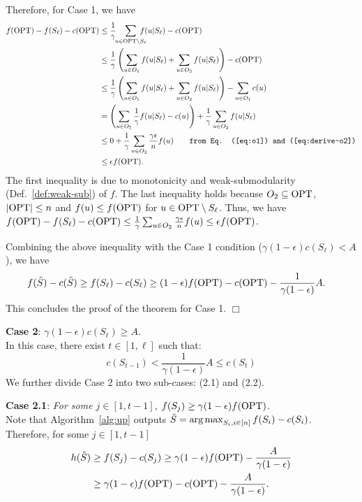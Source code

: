 \documentclass[10pt]{article} %
\DeclareMathOperator*{\argmax}{arg\,max}
\theoremstyle{remark}
\newcommand{\OPT}{{\rm OPT}}
\begin{document}
    Therefore, for Case 1, we have
    \begin{align*}
        f(\OPT)-f(S_\ell)-c(\OPT) &\leq \frac{1}{\gamma}\!\!\sum_{u \in \OPT \setminus S_{\ell}}\!\!\!\!\!\! f(u|S_\ell)-c(\OPT)\\
        &\leq \frac{1}{\gamma}\left(\sum_{u \in O_1} f(u|S_\ell)+\sum_{u \in O_2} f(u|S_\ell)\right)-c(\OPT)\\
        &\leq \frac{1}{\gamma}\left(\sum_{u \in O_1} f(u|S_\ell)+\sum_{u \in O_2} f(u|S_\ell)\right)-\sum_{u \in O_1} c(u) \\
        &=\left(\sum_{u \in O_1} \frac{1}{\gamma} f(u|S_\ell) - c(u)\right)+\frac{1}{\gamma}\sum_{u \in O_2} f(u|S_\ell)\\
        &\leq 0 + \frac{1}{\gamma} \sum_{u \in O_2} \frac{\gamma \epsilon}{n} f(u) \quad \quad \mbox{\tt from  Eq. (\ref{eq:o1}) and (\ref{eq:derive-o2})}\\
        &\leq \epsilon f(\OPT) .
    \end{align*}
    The first inequality is due to monotonicity and weak-submodularity (Def.~\ref{def:weak-sub}) of $f$.  The last inequality holds because $O_2 \subseteq \OPT$, $|\OPT| \leq n$ and $f(u) \leq f(\OPT)$ for $u \in \OPT \setminus S_\ell$. Thus, we have  $f(\OPT)-f(S_\ell)-c(\OPT) \leq \frac{1}{\gamma} \sum_{u \in O_2} \frac{\gamma \epsilon}{n} f(u) \leq \epsilon f(\OPT)$. 
     
     Combining the above inequality with the Case 1 condition ($\gamma (1-\epsilon)c(S_\ell) < A$), we have 
     \begin{align*}
         f(\Tilde{S})-c(\Tilde{S})& \geq f(S_\ell)-c(S_\ell)\geq (1-\epsilon)f(\OPT)-c(\OPT)-\frac{1}{\gamma (1-\epsilon)}A.
     \end{align*}
    {This concludes the proof of the theorem for Case 1}. \hfill $\Box$


 
    \textbf{Case 2}: $\gamma (1-\epsilon)c(S_\ell) \geq A$. \\
    In this case, there exist $t\in[1, \ell]$ such that:
    \begin{equation}
        c(S_{t-1})< \frac{1}{\gamma (1-\epsilon)} A  \leq c(S_t)
        \label{eq:th1-case2}
    \end{equation}
    We further divide Case 2 into two sub-cases: (2.1) and (2.2).

\textbf{Case 2.1}: \textit{For some $j\in [1,t-1]$, $f(S_{j}) \geq \gamma (1-\epsilon)f(\OPT)$}.\\
Note that Algorithm~\ref{alg:up} outputs $\Tilde{S} = \argmax_{S_i, i \in [n]} f(S_i)-c(S_i)$.
Therefore, for some $j\in [1,t-1]$
\begin{align*}
h(\Tilde{S}) &\geq f(S_j) - c(S_j)  \geq \gamma (1-\epsilon)f(\OPT)-\frac{A}{\gamma(1-\epsilon)} \\
& \geq \gamma (1-\epsilon)f(\OPT) - c(\OPT) - \frac{A}{\gamma(1-\epsilon)} .
\end{align*}
\end{document}
